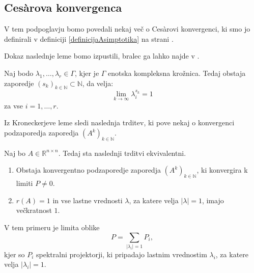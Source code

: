 \documentclass[mat1]{fmfdelo}
\newcommand{\R}{\mathbb R}
\newcommand{\N}{\mathbb N}
\begin{document}
\subsection{Ces\`arova konvergenca}
V tem podpoglavju bomo povedali nekaj več o Ces\`arovi konvergenci, ki smo jo definirali v definiciji \ref{definicijaAsimptotika} na strani \pageref{definicijaAsimptotika}.

Dokaz naslednje leme bomo izpustili, bralec ga lahko najde v \cite[str.~38, lema 3.9]{kramar}.
\begin{lema}[Kronecker]
    Naj bodo $\lambda_1, \ldots, \lambda_r \in \Gamma$, kjer je $\Gamma$ enotska kompleksna krožnica. Tedaj obstaja zaporedje $(s_k)_{k\in\N} \subset \N$, da velja:
    \begin{equation*}
        \lim_{k \rightarrow \infty} \lambda_i^{s_k} = 1
    \end{equation*}
    za vse $i = 1, \ldots, r$.
\end{lema}
Iz Kroneckerjeve leme sledi naslednja trditev, ki pove nekaj o konvergenci podzaporedja zaporedja $(A^k)_{k\in\N}$.
\begin{izrek}\label{izrek310}
    Naj bo $A \in \R^{n \times n}$. Tedaj sta naslednji trditvi ekvivalentni.
    \begin{enumerate}
        \item Obstaja konvergentno podzaporedje zaporedja $(A^k)_{k\in\N}$, ki konvergira k limiti $P \neq 0$.
        \item $r(A) = 1$ in vse lastne vrednosti $\lambda$, za katere velja $|\lambda| = 1$, imajo večkratnost $1$.
    \end{enumerate}
    V tem primeru je limita oblike
    \begin{equation*}
        P = \sum_{|\lambda_i| = 1} P_i,
    \end{equation*}
    kjer so $P_i$ spektralni projektorji, ki pripadajo lastnim vrednostim $\lambda_i$, za katere velja $|\lambda_i| = 1$.
\end{izrek}
\end{document}
